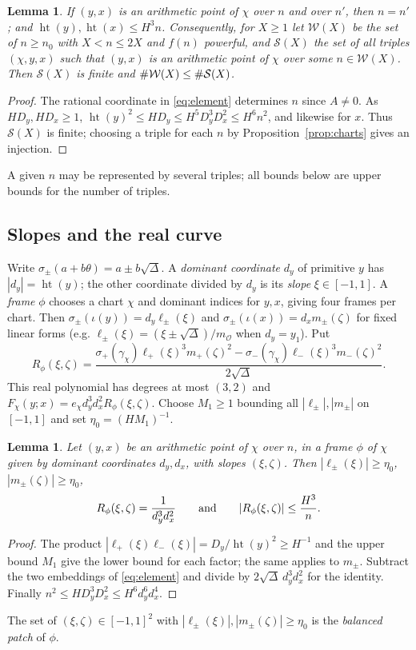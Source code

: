 \documentclass[11pt,reqno]{amsart}
\newtheorem{lemma}[theorem]{Lemma}
\theoremstyle{definition}
\theoremstyle{remark}
\numberwithin{equation}{section}
\newcommand{\OO}{\mathcal O}
\newcommand{\hgt}{\operatorname{ht}}
\begin{document}
\begin{lemma}\label{lem:recover}
If $(y,x)$ is an arithmetic point of $\chi$ over $n$ and over $n'$, then
$n=n'$; and $\hgt(y),\hgt(x)\le H^3n$. Consequently, for $X\ge1$ let
$\mathcal W(X)$ be the set of $n\ge n_0$ with $X<n\le2X$ and $f(n)$
powerful, and $\mathcal S(X)$ the set of all triples $(\chi,y,x)$ such that
$(y,x)$ is an arithmetic point of $\chi$ over some $n\in\mathcal W(X)$. Then
$\mathcal S(X)$ is finite and $\#\mathcal W(X)\le\#\mathcal S(X)$.
\end{lemma}
\begin{proof}
The rational coordinate in \eqref{eq:element} determines $n$ since
$A\ne0$. As $HD_y,HD_x\ge1$,
$\hgt(y)^2\le HD_y\le H^5D_y^3D_x^2\le H^6n^2$, and likewise for $x$.
Thus $\mathcal S(X)$ is finite; choosing a triple for each $n$ by
Proposition~\ref{prop:charts} gives an injection.
\end{proof}
A given $n$ may be represented by several triples; all bounds below are
upper bounds for the number of triples.

\subsection{Slopes and the real curve}
Write $\sigma_\pm(a+b\theta)=a\pm b\sqrt\Delta$.
A \emph{dominant coordinate} $d_y$ of primitive $y$ has
$|d_y|=\hgt(y)$; the other coordinate divided by $d_y$ is its
\emph{slope} $\xi\in[-1,1]$. A \emph{frame} $\phi$ chooses a
chart $\chi$ and dominant indices for $y,x$, giving four frames per
chart. Then $\sigma_\pm(\iota(y))=d_y\ell_\pm(\xi)$ and
$\sigma_\pm(\iota(x))=d_xm_\pm(\zeta)$ for fixed linear forms
(e.g. $\ell_\pm(\xi)=(\xi\pm\sqrt\Delta)/m_{\OO}$ when $d_y=y_1$).
Put
\[
 R_\phi(\xi,\zeta)=\frac{\sigma_+(\gamma_\chi)\ell_+(\xi)^3m_+(\zeta)^2
 -\sigma_-(\gamma_\chi)\ell_-(\xi)^3m_-(\zeta)^2}{2\sqrt\Delta}.
\]
This real polynomial has degrees at most $(3,2)$ and
$F_\chi(y;x)=e_\chi d_y^3d_x^2R_\phi(\xi,\zeta)$.
Choose $M_1\ge1$ bounding all $|\ell_\pm|,|m_\pm|$ on $[-1,1]$
and set $\eta_0=(HM_1)^{-1}$.

\begin{lemma}\label{lem:slopes}
Let $(y,x)$ be an arithmetic point of $\chi$ over $n$, in a frame $\phi$ of
$\chi$ given by dominant coordinates $d_y,d_x$, with slopes $(\xi,\zeta)$.
Then $|\ell_\pm(\xi)|\ge\eta_0$, $|m_\pm(\zeta)|\ge\eta_0$,
\[
 R_\phi(\xi,\zeta)=\frac1{d_y^3d_x^2}\qquad\textnormal{and}\qquad
 |R_\phi(\xi,\zeta)|\le\frac{H^3}{n}.
\]
\end{lemma}
\begin{proof}
The product $|\ell_+(\xi)\ell_-(\xi)|=D_y/\hgt(y)^2\ge H^{-1}$
and the upper bound $M_1$ give the lower bound for each factor;
the same applies to $m_\pm$. Subtract the two embeddings of
\eqref{eq:element} and divide by $2\sqrt\Delta\,d_y^3d_x^2$ for the
identity. Finally
$n^2\le HD_y^3D_x^2\le H^6d_y^6d_x^4$.
\end{proof}
The set of $(\xi,\zeta)\in[-1,1]^2$ with
$|\ell_\pm(\xi)|,|m_\pm(\zeta)|\ge\eta_0$ is the \emph{balanced patch} of
$\phi$.
\end{document}
